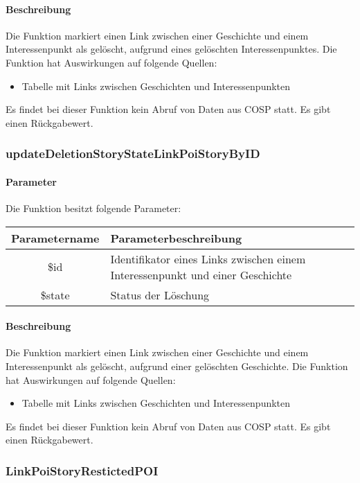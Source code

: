 \paragraph{Beschreibung} Die Funktion markiert einen Link zwischen einer Geschichte und einem Interessenpunkt als gelöscht, aufgrund eines gelöschten Interessenpunktes. Die Funktion hat Auswirkungen auf folgende Quellen:
\begin{itemize}
	\item Tabelle mit Links zwischen Geschichten und Interessenpunkten
\end{itemize}
Es findet bei dieser Funktion kein Abruf von Daten aus {\glqq COSP\grqq} statt. Es gibt einen Rückgabewert.
\subsubsection{updateDeletionStoryStateLinkPoiStoryByID}
\paragraph{Parameter} Die Funktion besitzt folgende Parameter:
\begin{table}[H]
	\begin{tabular}{|c|p{11cm}|}
		\hline
		\textbf{Parametername} & \textbf{Parameterbeschreibung} \\ \hline
		\$id    & Identifikator eines Links zwischen einem Interessenpunkt und einer Geschichte \\ \hline
		\$state & Status der Löschung \\ \hline
	\end{tabular}
\end{table}
\paragraph{Beschreibung} Die Funktion markiert einen Link zwischen einer Geschichte und einem Interessenpunkt als gelöscht, aufgrund einer gelöschten Geschichte. Die Funktion hat Auswirkungen auf folgende Quellen:
\begin{itemize}
	\item Tabelle mit Links zwischen Geschichten und Interessenpunkten
\end{itemize}
Es findet bei dieser Funktion kein Abruf von Daten aus {\glqq COSP\grqq} statt. Es gibt einen Rückgabewert.
\subsubsection{LinkPoiStoryRestictedPOI}
